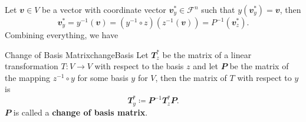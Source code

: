 \documentclass[math, code]{amznotes}
\theoremstyle{remark}
\begin{document}
Let $\mathbfit{v} \in V$ be a vector with coordinate vector $\mathbfit{v}_y^* \in \mathcal{F}^n$ such that $y(\mathbfit{v}_y^*) = \mathbfit{v}$, then 
\begin{equation*}
    \mathbfit{v}^*_y = y^{-1}(\mathbfit{v}) = \left(y^{-1} \circ z\right)\left(z^{-1}(\mathbfit{v})\right) = P^{-1}\left(\mathbfit{v}^*_z\right).
\end{equation*}
Combining everything, we have 
\begin{dfnbox}{Change of Basis Matrix}{changeBasis}
    Let $\mathbfit{T}_z^*$ be the matrix of a linear transformation $T \colon V \to V$ with respect to the basis $z$ and let $\mathbfit{P}$ be the matrix of the mapping $z^{-1} \circ y$ for some basis $y$ for $V$, then the matrix of $T$ with respect to $y$ is 
    \begin{equation*}
        \mathbfit{T}^*_y \coloneqq \mathbfit{P}^{-1}\mathbfit{T}_z^*\mathbfit{P}.
    \end{equation*}
    $\mathbfit{P}$ is called a {\color{red} \textbf{change of basis matrix}}.
\end{dfnbox}
\end{document}
